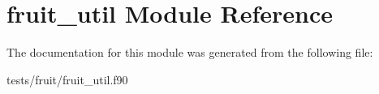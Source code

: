 \hypertarget{classfruit__util}{\section{fruit\-\_\-util Module Reference}
\label{classfruit__util}
}


The documentation for this module was generated from the following file\-:\begin{DoxyCompactItemize}
\item 
tests/fruit/fruit\-\_\-util.\-f90\end{DoxyCompactItemize}
